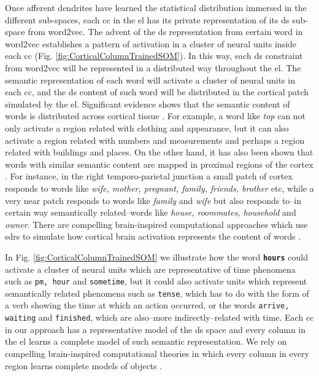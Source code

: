 {Once afferent dendrites have learned the statistical distribution immersed in the different  sub-spaces, each \gls{cc} in the \gls{el} has its private representation of its \gls{ds} sub-space from word2vec. The advent of the \gls{ds} representation from certain word in word2vec establishes a pattern of activation in a cluster of neural units inside each \gls{cc} (Fig. \ref{fig:CorticalColumnTrainedSOM}). In this way, each \gls{ds} constraint from word2vec will be represented in a distributed way throughout the \gls{el}. The semantic representation of each word will activate a cluster of neural units in each \gls{cc}, and the \gls{ds} content of such word will be distributed in the cortical patch simulated by the \gls{el}. Significant evidence shows that the semantic content of words is distributed across cortical tissue \cite{huth_natural_2016}. For example, a word like \emph{top} can not only activate a region related with clothing and appearance, but it can also activate a region related with numbers and measurements and perhaps a region related with buildings and places. On the other hand, it has also been shown that words with similar semantic content are mapped in proximal regions of the cortex \cite{pub.1005704802}. For instance, in the right temporo-parietal junction a small patch of cortex responds to words like \emph{wife, mother, pregnant, family, friends, brother} etc, while a very near patch responds to words like \emph{family} and \emph{wife} but also responds to--in certain way semantically related--words like \emph{house, roommates, household} and \emph{owner}. There are compelling brain-inspired computational approaches which use \glspl{sdr} to simulate how cortical brain activation represents the  content of words \cite{DBLP:journals/corr/Webber15}.

In Fig. \ref{fig:CorticalColumnTrainedSOM} we illustrate how the word \textbf{\texttt{hours}} could activate a cluster of neural units which are representative of time phenomena such as \texttt{pm, hour} and \texttt{sometime}, but it could also  activate units which represent semantically related phenomena such as \texttt{tense}, which has to do with the form of a verb showing the time at which an action occurred, or the words \texttt{arrive, waiting} and \texttt{finished}, which are also--more indirectly--related with time.
Each \gls{cc} in our approach has a representative model of the \gls{ds} space and every column in the \gls{el} learns a complete model of such semantic representation. We rely on compelling brain-inspired computational theories in which every column in every region learns complete models of objects \cite{10.3389/fncir.2018.00121}.  

}
